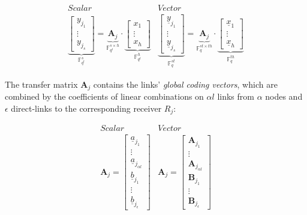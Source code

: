 \begin{equation}
\begin{array}{c|c}
Scalar & Vector\\
\underset{\ensuremath{\mathbb{F}}_{q^{t}}^{s}}{\underbrace{\left[\begin{array}{c}
y_{j_{1}}\\
\vdots\\
y_{j_{s}}
\end{array}\right]}}=\underset{\ensuremath{\mathbb{F}}_{q^{t}}^{s\times h}}{\underbrace{\boldsymbol{A}_{j}}}\cdot\underset{\ensuremath{\mathbb{F}}_{q^{t}}^{h}}{\underbrace{\left[\begin{array}{c}
x_{1}\\
\vdots\\
x_{h}
\end{array}\right]}} & \underset{\ensuremath{\mathbb{F}}_{q}^{st}}{\underbrace{\left[\begin{array}{c}
\underline{y}_{j_{1}}\\
\vdots\\
\underline{y}_{j_{s}}
\end{array}\right]}}=\underset{\ensuremath{\mathbb{F}}_{q}^{st\times th}}{\underbrace{\boldsymbol{A}_{j}}}\cdot\underset{\ensuremath{\mathbb{F}}_{q}^{th}}{\underbrace{\left[\begin{array}{c}
\underline{x}_{1}\\
\vdots\\
\underline{x}_{h}
\end{array}\right]}}
\end{array}\label{eq:linear_system}
\end{equation}

The transfer matrix $\boldsymbol{A}_{j}$ contains the links' \textit{global
coding vectors}, which are combined by the coefficients of linear
combinations on $\alpha l$ links from $\alpha$ nodes and $\epsilon$
direct-links to the corresponding receiver $R_{j}$:

\[
\begin{array}{c|c}
Scalar & Vector\\
\boldsymbol{A}_{j}=\left[\begin{array}{c}
\underline{a}_{j_{1}}\\
\vdots\\
\underline{a}_{j_{\alpha l}}\\
\underline{b}_{j_{1}}\\
\vdots\\
\underline{b}_{j_{\epsilon}}
\end{array}\right] & \boldsymbol{A}_{j}=\left[\begin{array}{c}
\boldsymbol{A}_{j_{1}}\\
\vdots\\
\boldsymbol{A}_{j_{\alpha l}}\\
\boldsymbol{B}_{j_{1}}\\
\vdots\\
\boldsymbol{B}_{j_{\epsilon}}
\end{array}\right]
\end{array}
\]

